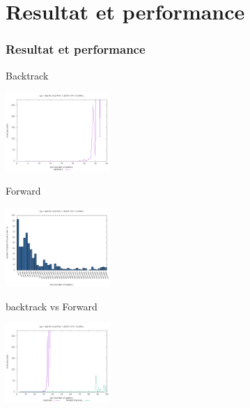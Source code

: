 \documentclass[9pt,a4paper]{beamer}
\begin{document}
\section{Resultat et performance}
\begin{frame}
	\frametitle{Resultat et performance}

	\begin{block}{Backtrack}

	\includegraphics[width=0.3\textwidth]{images/plot_bt_i7.png}

	\end{block}

	\begin{block}{Forward}

	\includegraphics[width=0.3\textwidth]{images/plot_fw_i7.png}

	\end{block}

	\begin{block}{backtrack vs Forward}

	\includegraphics[width=0.3\textwidth]{images/plot_bt_fw_i7.png}

	\end{block}



\end{frame}
\end{document}
